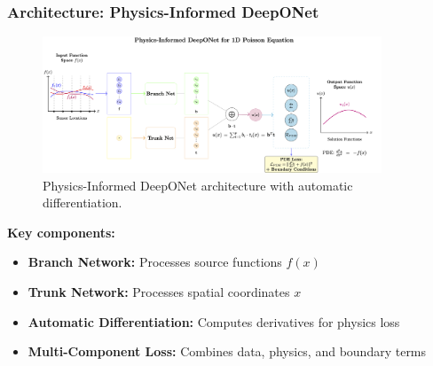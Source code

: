 \documentclass[notes]{beamer}
\begin{document}
\begin{frame}
\frametitle{Architecture: Physics-Informed DeepONet}

\begin{figure}[ht]
    \centering
    \includegraphics[width=0.9\textwidth]{figs/pideeponet-arch.png}
    \caption*{Physics-Informed DeepONet architecture with automatic differentiation.}
\end{figure}

\textbf{Key components:}
\begin{itemize}
    \item \textbf{Branch Network:} Processes source functions $f(x)$
    \item \textbf{Trunk Network:} Processes spatial coordinates $x$
    \item \textbf{Automatic Differentiation:} Computes derivatives for physics loss
    \item \textbf{Multi-Component Loss:} Combines data, physics, and boundary terms
\end{itemize}

\end{frame}
\end{document}
